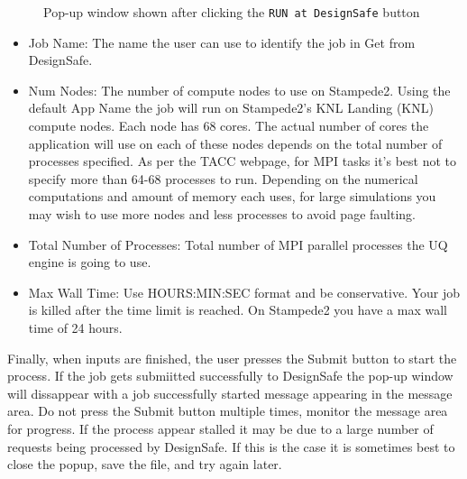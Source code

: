 \begin{figure}[!htbp]
  \caption{Pop-up window shown after clicking the \texttt{RUN at DesignSafe} button}
  \label{fig:remote_button}
\end{figure}

\begin{itemize}
\item Job Name: The name the user can use to identify the job in Get from DesignSafe.
\item Num Nodes: The number of compute nodes to use on Stampede2. Using the default App Name the job will run on Stampede2’s KNL Landing (KNL) 
compute nodes. Each node has 68 cores. The actual number of cores the
application will use on each of these nodes depends on the total
number of processes specified. As per the TACC webpage, for MPI tasks
it’s best not to specify more than 64-68 processes to run. Depending
on the numerical computations and amount of memory each uses, for large simulations you may wish to use more nodes and less processes to
avoid page faulting.
\item Total Number of Processes: Total number of MPI parallel processes the UQ engine is going to use.
\item Max Wall Time: Use HOURS:MIN:SEC format and be conservative. Your job is killed after the time limit is reached. On Stampede2 you have a max wall time of 24 hours.
\end{itemize}

Finally, when inputs are finished, the user presses the Submit button to start the process. If
the job gets submiitted successfully to DesignSafe the pop-up window will dissappear with a job successfully started message appearing in the message area. Do not press the Submit button multiple times, monitor the message area for progress. If the process appear stalled it may be due to a large number of requests being processed by DesignSafe. If this is the case it is sometimes best to close the popup, save the file, and try again later.


